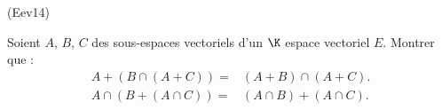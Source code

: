 \begin{tiny}(Eev14)\end{tiny} Soient $A$, $B$, $C$ des sous-espaces vectoriels d'un $\K$ espace vectoriel $E$. Montrer que :
\begin{align*}
 A+\left( B\cap(A+C)\right) =& (A+B)\cap(A+C). \\
 A\cap \left( B+(A\cap C)\right) =& (A\cap B)+(A\cap C). 
\end{align*}
